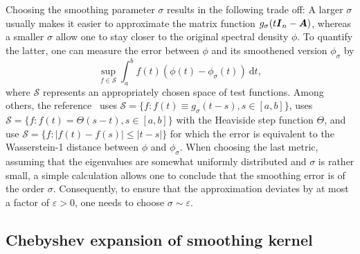 Choosing the smoothing parameter $\sigma$ results in the following trade off: A larger $\sigma$ usually makes it  easier to approximate the matrix function $g_{\sigma}(t\boldsymbol{I}_n - \boldsymbol{A})$, whereas a smaller $\sigma$ allow one to stay closer to the original spectral density $\phi$. To quantify the latter, one can measure the error between $\phi$ and its smoothened version $\phi_{\sigma}$ by
\begin{equation}
    \sup_{f \in \mathcal{S}} \int_{a}^{b} f(t) (\phi(t) - \phi_{\sigma}(t))~\mathrm{d}t,
    \label{equ:error-metric}
\end{equation}
where $\mathcal{S}$ represents an appropriately chosen space of test functions. Among others, the reference~\cite{lin-2016-approximating-spectral} uses $\mathcal{S} = \{ f: f(t) \equiv g_{\sigma}(t - s), s \in [a, b]\}$, \cite{chen-2021-analysis-stochastic} uses $\mathcal{S} = \{f : f(t) = \Theta(s - t), s \in [a, b] \}$ with the Heaviside step function $\Theta$, and \cite{braverman-2022-sublinear-time,bhattacharjee-2024-improved-spectral} use $\mathcal{S} = \{f : |f(t) - f(s)| \leq |t - s| \}$ for which the error  is equivalent to the Wasserstein-1 distance between $\phi$ and $\phi_{\sigma}$.
When choosing 
the last metric,
assuming that the eigenvalues are somewhat uniformly distributed and $\sigma$ is rather small, a simple calculation allows one to conclude that the smoothing error  is of the order $\sigma$. Consequently, to ensure that the approximation deviates by at most a factor of $\varepsilon > 0$, one needs to choose $\sigma \sim \varepsilon$.

\subsection{Chebyshev expansion of smoothing kernel}
\label{subsec:chebyshev-expansion}


